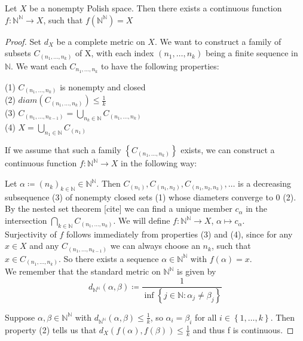 \documentclass[10pt, a4paper, titlepage]{article}
\numberwithin{equation}{section}
\begin{document}
\begin{theorem}
	Let $X$ be a nonempty Polish space. Then there exists a continuous function $f: \mathbb{N}^\mathbb{N} \to X $, such that $f\left( \mathbb{N}^\mathbb{N} \right) = X$
\end{theorem}
\begin{proof}
Set $d_X$ be a complete metric on $X$. We want to construct a family of subsets $C_{(n_1,\ldots,n_k)}$ of X, 
with each index $\left( n_1,\ldots,n_k \right) $ being a finite sequence in $\mathbb{N}$.	
We want each  $C_{n_1,\ldots,n_k}$ to have the following properties:

(1) $C_{\left( n_1,\ldots,n_k \right) }$ is nonempty and closed\\
(2) $diam \left( C_{\left( n_1,\ldots,n_k \right) } \right) \leq \frac{1}{k}$\\
(3) $C_{\left( n_1,\ldots,n_{k-1} \right) } = \bigcup_{n_k \in \mathbb{N}} C_{\left( n_1,\ldots,n_k \right) }$ \\
(4) $X = \bigcup_{n_1 \in \mathbb{N}} C_{\left( n_1 \right) }$

If we assume that such a family $\left\{ C_{\left( n_1,\ldots,n_k \right) }  \right\} $ exists, we can construct a continuous function $f: \mathbb{N}^\mathbb{N} \to X$ in the following way:

Let $\alpha \coloneq \left( n_k \right)_{k \in \mathbb{N}} \in \mathbb{N}^{\mathbb{N}}$.
Then $C_{\left( n_1 \right) }, C_{\left( n_1,n_2 \right) },C_{\left( n_1,n_2,n_3 \right) },\ldots$ is a decreasing subsequence (3) of nonempty closed sets (1) whose diameters converge to 0 (2).
By the nested set theorem [cite] we can find a unique member $c_\alpha$ in the intersection $\bigcap_{k \in \mathbb{N}} C_{\left( n_1,\ldots,n_k \right) }$.
We will define $f: \mathbb{N}^\mathbb{N} \to X$, $ \alpha \mapsto c_{\alpha}$.\\
Surjectivity of $f$ follows immediately from properties  (3) and (4), since for any $ x \in X$ and any $C_{\left( n_1,\ldots,n_{k-1} \right) }$ we can always choose an $n_k$, such that  $x \in C_{\left( n_1,\ldots,n_k \right) }$. 
So there exists a sequence $\alpha \in \mathbb{N}^\mathbb{N}$ with $f(\alpha) = x$.\\
We remember that the standard metric on $\mathbb{N}^\mathbb{N}$ is given by 
\[d_{\mathbb{N}^\mathbb{N}} \left( \alpha, \beta \right) \coloneq \frac{1}{\inf\left\{ j \in \mathbb{N}: \alpha_j \neq \beta_j \right\} }\]

Suppose $\alpha,\beta \in  \mathbb{N}^\mathbb{N}$ with $d_{\mathbb{N}^\mathbb{N}}\left( \alpha,\beta \right) \leq \frac{1}{k} $, so $\alpha_i = \beta_i$ for all  $i \in \left\{ 1,\ldots,k \right\} $.
Then property (2) tells us that $d_X\left( f\left( \alpha \right), f\left( \beta \right)  \right) \leq \frac{1}{k}$ and thus f is continuous. 


\end{proof}
\end{document}
